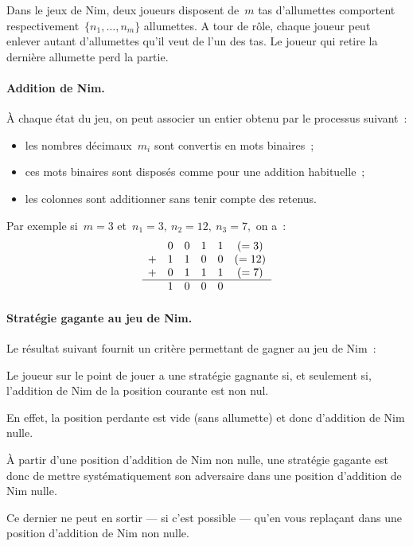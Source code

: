   Dans le jeux de Nim, deux joueurs disposent de~$m$ tas d'allumettes
  comportent respectivement~${\{n_{1},\ldots,n_{m}\}}$ allumettes. A
  tour de r\^ole, chaque joueur peut enlever autant d'allumettes qu'il
  veut de l'un des tas. Le joueur qui retire la derni\`ere allumette
  perd la partie.
  \paragraph{Addition de Nim.}
  \`A chaque \'etat du jeu, on peut associer un entier obtenu par le
  processus suivant~:
  \begin{itemize}
  \item les nombres d\'ecimaux~$m_{i}$ sont convertis en mots
    binaires~;
  \item ces mots binaires sont dispos\'es comme pour une addition
    habituelle~;
  \item les colonnes sont additionner sans tenir compte des retenus.
  \end{itemize}
  Par exemple si~${m=3}$ et~${n_{1}=3,\ n_{2}=12,\ n_{3}=7,}$ on a~:
  \[
  \begin{array}{cccccc}
    & 0 & 0 & 1 & 1 & (=3)\\
    + & 1 & 1 & 0 & 0 & (=12)\\
    + & 0 & 1 & 1 & 1 & (=7)\\
    \hline
    & 1 & 0 & 0 & 0
  \end{array}
  \]
  \paragraph{Strat\'egie gagante au jeu de Nim.}
    Le r\'esultat suivant fournit un crit\`ere permettant de gagner au
    jeu de Nim~:
    \begin{theoreme}
      Le joueur sur le point de jouer a une strat\'egie gagnante si,
      et seulement si, l'addition de Nim de la position courante est
      non nul.      
    \end{theoreme}
    En effet, la position perdante est vide (sans allumette) et donc
    d'addition de Nim nulle. 
    \par
    \`A partir d'une position d'addition de
    Nim non nulle, une strat\'egie gagante est donc de mettre
    syst\'ematiquement son adversaire dans une position d'addition de
    Nim nulle.
    \par
    Ce dernier ne peut en sortir --- si c'est possible ---
    qu'en vous repla\c{c}ant dans une position d'addition de Nim non
    nulle.
